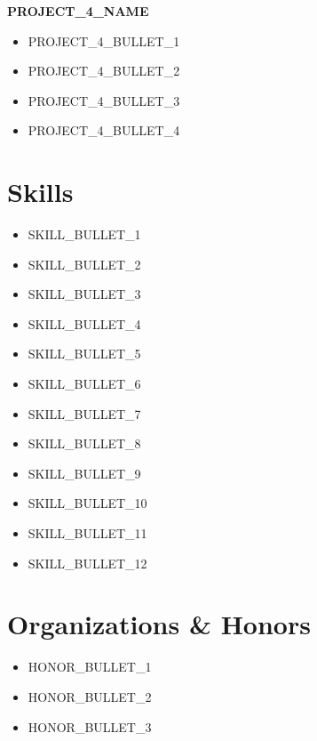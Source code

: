 \documentclass[a4paper,10pt]{article}
\begin{document}
\vspace{5pt}

\noindent \textbf{ {{PROJECT_4_NAME}} }
\begin{itemize}
    \item {{PROJECT_4_BULLET_1}}
    \item {{PROJECT_4_BULLET_2}}
    \item {{PROJECT_4_BULLET_3}}
    \item {{PROJECT_4_BULLET_4}}
\end{itemize}

\section{Skills}
\begin{itemize}
    \item {{SKILL_BULLET_1}}
    \item {{SKILL_BULLET_2}}
    \item {{SKILL_BULLET_3}}
    \item {{SKILL_BULLET_4}}
    \item {{SKILL_BULLET_5}}
    \item {{SKILL_BULLET_6}}
    \item {{SKILL_BULLET_7}}
    \item {{SKILL_BULLET_8}}
    \item {{SKILL_BULLET_9}}
    \item {{SKILL_BULLET_10}}
    \item {{SKILL_BULLET_11}}
    \item {{SKILL_BULLET_12}}
\end{itemize}

\section{Organizations \& Honors}
\begin{itemize}
    \item {{HONOR_BULLET_1}}
    \item {{HONOR_BULLET_2}}
    \item {{HONOR_BULLET_3}}
\end{itemize}
\end{document}

